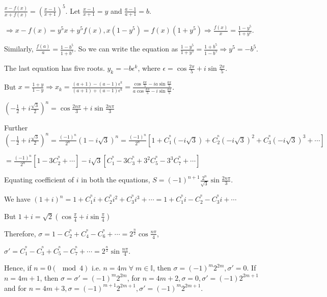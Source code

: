   $\frac{x - f(x)}{x + f(x)} = \left(\frac{x - 1}{x + 1}\right)^5$. Let $\frac{x - 1}{x + 1} = y$ and
  $\frac{a - 1}{a + 1} = b$.

  $\Rightarrow x - f(x) = y^5x + y^5f(x), x(1 - y^5) = f(x)(1 + y^5)\Rightarrow \frac{f(x)}{x} = \frac{1 -
    y^5}{1 + y^5}$.

  Similarly, $\frac{f(a)}{a} = \frac{1 - b^5}{1 + b^5}$. So we can write the equation as $\frac{1 - y^5}{1 +
    y^5} = \frac{1 + b^5}{1 - b^5}\Rightarrow y^5 = -b^5$.

  The last equation has five roots. $y_k = -b\epsilon^k$, where $\epsilon = \cos\frac{2\pi}{5} +
  i\sin\frac{2\pi}{5}$.

  But $x = \frac{1 + y}{1 - y}\Rightarrow x_k = \frac{(a + 1) - (a - 1)\epsilon^k}{(a + 1) + (a -
    1)\epsilon^k} = \frac{\cos\frac{k\pi}{5} - ia\sin\frac{k\pi}{5}}{a\cos\frac{k\pi}{5} -
    i\sin\frac{k\pi}{5}}$.
\item $\left(-\frac{1}{2} + i\frac{\sqrt{3}}{2}\right)^n = \cos\frac{2n\pi}{3} + i\sin\frac{2n\pi}{3}$

  Further $\left(-\frac{1}{2} + i\frac{\sqrt{3}}{2}\right)^n = \frac{(-1)^n}{2^n}(1 - i\sqrt{3})^n =
  \frac{(-1)^n}{2^n}[1 + C_1^^n(-i\sqrt{3}) + C_2^^n(-i\sqrt{3})^2 + C_3^^n(-i\sqrt{3})^3 + \cdots]$

  $= \frac{(-1)^n}{2^n}[1 - 3C_2^^n + \cdots] -i\sqrt{3}[C_1^^n -3C_3^^n + 3^2C_5^^n - 3^3C_7^^n + \cdots]$

  Equating coefficient of $i$ in both the equations, $S = (-1)^{n +
    1}\frac{2^n}{\sqrt{3}}\sin\frac{2n\pi}{3}$.
\item We have $(1 + i)^n = 1 + C_1^^n i + C_2^^n i^2 + C_3^^n i^3 + \cdots = 1 + C_1^^n i - C_2^^n - C_3^^n
  i + \cdots$

  But $1 + i = \sqrt{2}\left(\cos\frac{\pi}{4} + i\sin\frac{\pi}{4}\right)$

  Therefore, $\sigma = 1 - C_2^^n + C_4^^n -C_6^^n + \cdots = 2^{\frac{n}{2}}\cos\frac{n\pi}{4}$,

  $\sigma' = C_1^^n - C_3^^n + C_5^^n - C_7^^n + \cdots = 2^{\frac{n}{2}}\sin\frac{n\pi}{4}$.

  Hence, if $n = 0(\mod 4)$ i.e. $n = 4m\;\forall\;m\in\mathbb{I}$, then $\sigma = (-1)^m2^{2m}, \sigma' =
  0$. If $n = 4m + 1$, then $\sigma = \sigma' = (-1)^m2^{2m}$, for $n = 4m + 2, \sigma = 0, \sigma' =
  (-1)2^{2m + 1}$ and for $n = 4m + 3, \sigma = (-1)^{m + 1}2^{2m + 1}, \sigma' = (-1)^m2^{2m + 1}$.

\stopitemize
